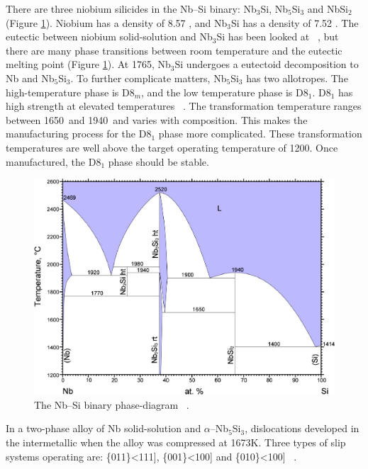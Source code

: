 There are three niobium silicides in the Nb--Si binary: Nb$_3$Si, Nb$_5$Si$_3$ and NbSi$_2$ (Figure \ref{fig:NbSi}).  Niobium has a density of 8.57  \gram\usk\centi\rpcubic\meter, and Nb$_3$Si has a density of 7.52  \gram\usk\centi\rpcubic\meter.  The eutectic between niobium solid-solution and Nb$_3$Si has been looked at ~\cite{kimura05}, but there are many phase transitions between room temperature and the eutectic melting point (Figure \ref{fig:NbSi}).  At 1765\celsius, Nb$_3$Si undergoes a eutectoid decomposition to Nb and Nb$_5$Si$_3$.  To further complicate matters, Nb$_5$Si$_3$ has two allotropes.  The high-temperature phase is D8$_{m}$, and the low temperature phase is D8$_1$.  D8$_1$ has high strength at elevated temperatures ~\cite{bewlay01}.  The transformation temperature ranges between 1650\celsius\ and 1940\celsius\, and varies with composition.  This makes the manufacturing process for the D8$_1$ phase more complicated.  These transformation temperatures are well above the target operating temperature of 1200\celsius.  Once manufactured, the D8$_1$ phase should be stable.

%
\begin{figure}[H]
\begin{center}
\includegraphics[width=12cm]{NbSi}
\vspace{-2mm}
\caption{The Nb--Si binary phase-diagram ~\cite{okamoto90}.}\label{fig:NbSi}
\end{center}
\end{figure}  
%

In a two-phase alloy of Nb solid-solution and $\alpha$--Nb$_5$Si$_3$,  dislocations developed in the intermetallic when the alloy was compressed at 1673K.  Three types of slip systems operating are: \{011\}<111], \{001\}<100] and \{010\}<100] ~\cite{sekido10}.

